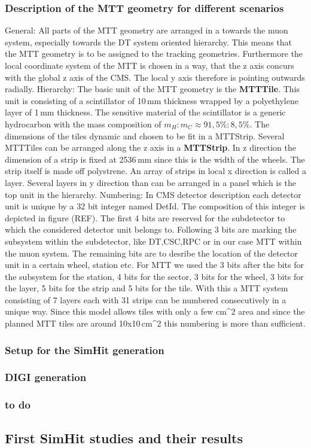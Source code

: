 \subsubsection{Description of the MTT geometry for different scenarios}
	General:
	All parts of the MTT geometry are arranged in a towards the muon system, especially towards the DT system oriented hierarchy.
	This means that the MTT geometry is to be assigned to the tracking geometries.
	Furthermore the local coordinate system of the MTT is chosen in a way, that the z axis concurs with the global z axis of the CMS.
	The local y axis therefore is pointing outwards radially.
	Hierarchy:
	The basic unit of the MTT geometry is the \textbf{MTTTile}.
	This unit is consisting of a scintillator of 10\,mm thickness wrapped by a polyethylene layer of 1\,mm thickness.
	The sensitive material of the scintillator is a generic hydrocarbon with the mass composition of $m_H:m_C \approx 91,5\%:8,5\%$. 
	The dimensions of the tiles dynamic and chosen to be fit in a MTTStrip.
	Several MTTTiles can be arranged along the z axis in a \textbf{MTTStrip}.
	In z direction the dimension of a strip is fixed at 2536\,mm since this is the width of the wheels. 
	The strip itself is made off polystrene.
	An array of strips in local x direction is called a layer.
	Several layers in y direction than can be arranged in a panel which is the top unit in the hierarchy.
	Numbering:
	In CMS detector description each detector unit is unique by a 32 bit integer named DetId.
	The composition of this integer is depicted in figure (REF).
	The first 4 bits are reserved for the subdetector to which the considered detector unit belongs to.
	Following 3 bits are marking the subsystem within the subdetector, like DT,CSC,RPC or in our case MTT within the muon system.
	The remaining bits are to desribe the location of the detector unit in a certain wheel, station etc.
	For MTT we used the 3 bits after the bits for the subsystem for the station, 4 bits for the sector, 3 bits for the wheel, 3 bits for the layer, 5 bits for the strip and 5 bits for the tile.
	With this a MTT system consisting of 7 layers each with 31 strips can be numbered consecutively in a unique way.
	Since this model allows tiles with only a few cm^2 area and since the planned MTT tiles are around 10x10\,cm^2 this numbering is more than sufficient. 
\subsubsection{Setup for the SimHit generation}
\subsubsection{DIGI generation}
\subsubsection{to do}
\subsection{First SimHit studies and their results}
